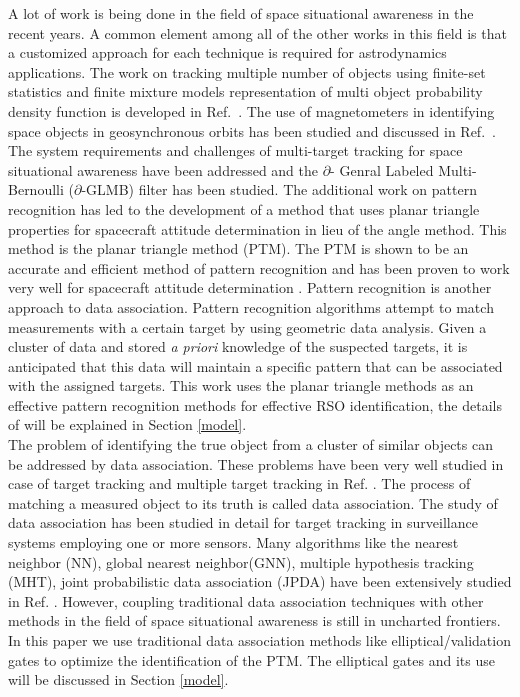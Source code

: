 \documentclass[]{aiaa-tc}%
\begin{document}
A lot of work is being done in the field of space situational awareness in the recent years. A common element among all of the other works in this field is that a customized approach for
each technique is required for astrodynamics applications. The work on tracking multiple number of objects using finite-set statistics and finite mixture models representation of multi object probability density function is developed in Ref.~. The use of magnetometers in identifying space objects in geosynchronous orbits has been studied and discussed in Ref.~. The system requirements and challenges of multi-target tracking for space situational awareness have been addressed and the $\partial$- Genral Labeled Multi-Bernoulli ($\partial$-GLMB) filter has been studied. The additional work on pattern recognition has led to the development of a method that uses planar triangle properties for spacecraft attitude determination in lieu of the angle method.  This method is the planar triangle method (PTM). The PTM is shown to be an accurate and efficient method of pattern recognition and has been proven to work very well for spacecraft attitude determination \cite{cole_fast_2006}. Pattern recognition is another approach to data association. Pattern recognition algorithms attempt to match measurements with a certain target by using geometric data analysis. Given a cluster of data and stored \textit{a priori} knowledge of the suspected targets, it is anticipated that this data will maintain a specific pattern that can be associated with the assigned targets. This work uses the planar triangle methods as an effective pattern recognition methods for effective RSO identification, the details of will be explained in Section \ref{model}.\\ 

The problem of identifying the true object from a cluster of similar objects can be addressed by data association. These problems have been very well studied in case of target tracking and multiple target tracking in  Ref. . The process of matching a measured object to its truth is called data association. The study of data association has been studied in detail for target tracking in surveillance systems employing one or more sensors. Many algorithms like the nearest neighbor (NN), global nearest neighbor(GNN), multiple hypothesis tracking (MHT), joint probabilistic data association (JPDA) have been extensively studied in Ref. . However, coupling traditional data association techniques with other methods in the field of space situational awareness is still in uncharted frontiers. In this paper we use traditional data association methods like elliptical/validation gates to optimize the identification of the PTM. The elliptical gates and its use will be discussed in Section \ref{model}.
\end{document}
